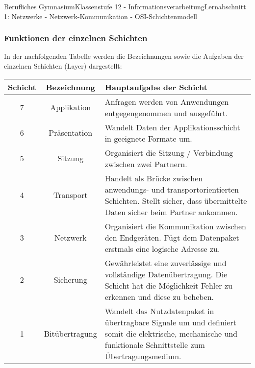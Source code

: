 \documentclass[11pt,oneside,openany,headings=optiontotoc,11pt,numbers=noenddot]{article}
\begin{document}
\begin{worksheet}{Berufliches Gymnasium}{Klassenstufe 12 - Informationsverarbeitung}{Lernabschnitt 1: Netzwerke - Netzwerk-Kommunikation - OSI-Schichtenmodell}
		\subsubsection{Funktionen der einzelnen Schichten}
		In der nachfolgenden Tabelle werden die Bezeichnungen sowie die Aufgaben der einzelnen Schichten (Layer) dargestellt:\\
		\par\noindent
		\renewcommand{\arraystretch}{1.5}
		\begin{tabularx}{\textwidth}{|c|c|X|}
			\hline
			\rowcolor{gray!10} \textbf{Schicht} & \textbf{Bezeichnung} & \textbf{Hauptaufgabe der Schicht}\\
			\hline
			7 & Applikation & Anfragen werden von Anwendungen entgegengenommen und ausgeführt.\\
			\hline
			6 & Präsentation & Wandelt Daten der Applikationsschicht in geeignete Formate um.\\
			\hline
			5 & Sitzung & Organisiert die Sitzung / Verbindung zwischen zwei Partnern.\\
			\hline
			4 & Transport & Handelt als Brücke zwischen anwendungs- und transportorientierten Schichten. Stellt sicher, dass übermittelte Daten sicher beim Partner ankommen.\\
			\hline
			3 & Netzwerk & Organisiert die Kommunikation zwischen den Endgeräten. Fügt dem Datenpaket erstmals eine logische Adresse zu.\\
			\hline
			2 & Sicherung & Gewährleistet eine zuverlässige und vollständige Datenübertragung. Die Schicht hat die Möglichkeit Fehler zu erkennen und diese zu beheben.\\
			\hline
			1 & Bitübertragung & Wandelt das Nutzdatenpaket in übertragbare Signale um und definiert somit die elektrische, mechanische und funktionale Schnittstelle zum Übertragungsmedium.\\
			\hline
		\end{tabularx}
	\end{worksheet}
\end{document}
